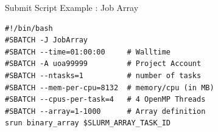 \documentclass[final,t]{beamer}
\begin{document}
\begin{frame}[fragile]{}
\begin{columns}[t]
\begin{column}{.35\linewidth}
      \begin{block}{Submit Script Example : Job Array}
              \vspace*{-3ex}
        \begin{verbatim}
#!/bin/bash
#SBATCH -J JobArray
#SBATCH --time=01:00:00     # Walltime
#SBATCH -A uoa99999         # Project Account
#SBATCH --ntasks=1          # number of tasks
#SBATCH --mem-per-cpu=8132  # memory/cpu (in MB)
#SBATCH --cpus-per-task=4   # 4 OpenMP Threads
#SBATCH --array=1-1000      # Array definition
srun binary_array $SLURM_ARRAY_TASK_ID
        \end{verbatim}
                \vspace*{-4ex}
      \end{block}



\end{column}
\end{columns}
\end{frame}
\end{document}

